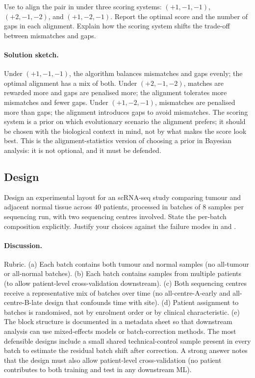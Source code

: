 \begin{exercise}
Use
to align the pair in
under three scoring systems: $(+1, -1, -1)$, $(+2, -1, -2)$, and
$(+1, -2, -1)$. Report the optimal score and the number of gaps in
each alignment. Explain how the scoring system shifts the trade-off
between mismatches and gaps.

\paragraph{Solution sketch.}
Under $(+1, -1, -1)$, the algorithm balances mismatches and gaps
evenly; the optimal alignment has a mix of both. Under $(+2, -1, -2)$,
matches are rewarded more and gaps are penalised more; the alignment
tolerates more mismatches and fewer gaps. Under $(+1, -2, -1)$,
mismatches are penalised more than gaps; the alignment introduces gaps
to avoid mismatches. The scoring system is a prior on which
evolutionary scenario the alignment prefers; it should be chosen with
the biological context in mind, not by what makes the score look
best. This is the alignment-statistics version of choosing a prior in
Bayesian analysis: it is not optional, and it must be defended.
\end{exercise}

\subsection*{Design}

\begin{exercise}
Design an experimental layout for an scRNA-seq study comparing tumour
and adjacent normal tissue across $40$ patients, processed in batches
of $8$ samples per sequencing run, with two sequencing centres
involved. State the per-batch composition explicitly. Justify your
choices against the failure modes in
 and
.

\paragraph{Discussion.}
Rubric. (a) Each batch contains both tumour and normal samples (no
all-tumour or all-normal batches). (b) Each batch contains samples
from multiple patients (to allow patient-level cross-validation
downstream). (c) Both sequencing centres receive a representative
mix of batches over time (no all-centre-A-early and all-centre-B-late
design that confounds time with site). (d) Patient assignment to
batches is randomised, not by enrolment order or by clinical
characteristic. (e) The block structure is documented in a metadata
sheet so that downstream analysis can use mixed-effects models or
batch-correction methods. The most defensible designs include a small
shared technical-control sample present in every batch to estimate
the residual batch shift after correction. A strong answer notes that
the design must also allow patient-level cross-validation (no patient
contributes to both training and test in any downstream ML).
\end{exercise}

